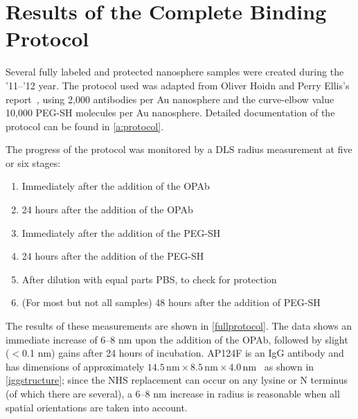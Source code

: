 
\def\mytitle{Chapter 2 -- Results of the Fully Optimized Protocol}

\def\bibliocommand{}
\chapter{Results of the Complete Binding Protocol}
\label{resultsofthecompletebindingprotocol}

Several fully labeled and protected nanosphere samples were created during the '11--'12 year. The protocol used was adapted from Oliver Hoidn and Perry Ellis's report~\citep{hoidnellis}, using 2,000 antibodies per Au nanosphere and the curve-elbow value 10,000 PEG-SH molecules per Au nanosphere. Detailed documentation of the protocol can be found in \autoref{a:protocol}.

The progress of the protocol was monitored by a DLS radius measurement at five or six stages:

\begin{enumerate}
\item Immediately after the addition of the OPAb

\item 24 hours after the addition of the OPAb

\item Immediately after the addition of the PEG-SH

\item 24 hours after the addition of the PEG-SH

\item After dilution with equal parts PBS, to check for protection

\item (For most but not all samples) 48 hours after the addition of PEG-SH

\end{enumerate}

The results of these measurements are shown in \autoref{fullprotocol}. The data shows an immediate increase of 6--8 nm upon the addition of the OPAb, followed by slight ($<$0.1 nm) gains after 24 hours of incubation. AP124F is an IgG antibody and has dimensions of approximately $14.5\mathrm{\,nm}\times8.5\mathrm{\,nm}\times4.0\mathrm{\,nm}$~\citep{antibodylength} as shown in \autoref{iggstructure};
since the NHS replacement can occur on any lysine or N terminus (of which there are several), a 6--8 nm increase in radius is reasonable when all spatial orientations are taken into account.


